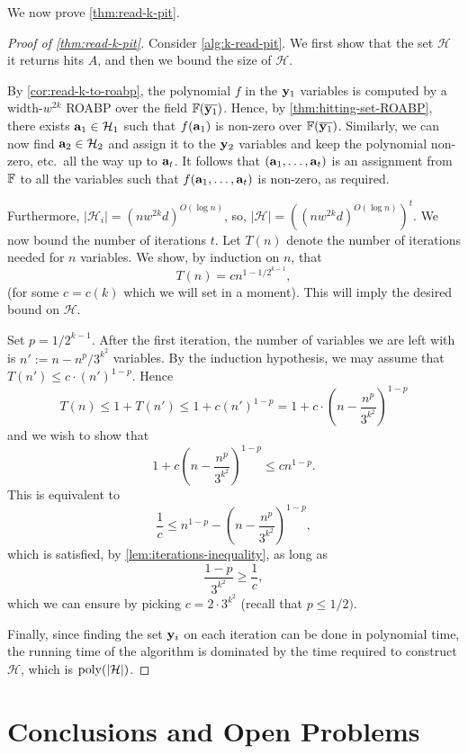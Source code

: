 \documentclass[11pt]{article}
\newcommand{\cH}{\mathcal{H}}
\begin{document}
We now prove \autoref{thm:read-k-pit}.

\begin{proof}[Proof of \autoref{thm:read-k-pit}]
Consider \autoref{alg:k-read-pit}. We first show that the set $\cH$ it returns hits $A$, and then we bound the size of $\cH$.

By \autoref{cor:read-k-to-roabp}, the polynomial $f$ in the $\mathbf{y}_1$ variables is computed by a width-$w^{2k}$ ROABP over the field $\F(\overline{\vecy_1})$. Hence, by \autoref{thm:hitting-set-ROABP}, there exists $\veca_1 \in \cH_1$ such that $f(\mathbf{a}_1)$ is non-zero over $\F(\overline{\vecy_1})$. Similarly, we can now find $\veca_2 \in \cH_2$ and assign it to the $\mathbf{y}_2$ variables and keep the polynomial non-zero, etc.\ all the way up to $\mathbf{a}_t$. It follows that $(\mathbf{a}_1, \ldots, \mathbf{a}_t)$ is an assignment from $\F$ to all the variables such that $f(\mathbf{a}_1, \ldots, \mathbf{a}_t)$ is non-zero, as required.

Furthermore, $|\cH_i| = (nw^{2k}d)^{O(\log n)}$, so, $|\cH| = ((nw^{2k}d)^{O(\log n)})^t$. We now bound the number of iterations $t$. Let $T(n)$ denote the number of iterations needed for $n$ variables. We show, by induction on $n$, that
\[
T(n) = c n^{1-1/2^{k-1}},
\]
(for some $c=c(k)$ which we will set in a moment). This will imply the desired bound on $\cH$.

Set $p = 1/2^{k-1}$. After the first iteration, the number of variables we are left with is $n':=n-n^{p}/3^{k^2}$ variables. By the induction hypothesis, we may assume that $T(n') \le c \cdot (n')^{1-p}$. Hence
\[
T(n) \le 1+T(n') \le 1+ c (n')^{1-p} = 1 + c \cdot \left( n - \frac{n^p}{3^{k^2}} \right) ^ {1-p}
\]
and we wish to show that
\[
1 + c \left( n - \frac{n^p}{3^{k^2}} \right) ^ {1-p} \le  c n^{1-p}.
\]
This is equivalent to
\[
\frac{1}{c} \le n^{1-p} - \left( n - \frac{n^p}{3^{k^2}} \right) ^ {1-p},
\]
which is satisfied, by \autoref{lem:iterations-inequality}, as long as
\[
\frac{1-p}{3^{k^2}} \ge \frac{1}{c},
\]
which we can ensure by picking $c=2\cdot 3^{k^2}$ (recall that $p \le 1/2)$.

Finally, since finding the set $\mathbf{y}_i$ on each iteration can be done in polynomial time, the running time of the algorithm is dominated by the time required to construct $\cH$, which is $\poly(|\cH|)$.
\end{proof}


\section{Conclusions and Open Problems}
\end{document}
